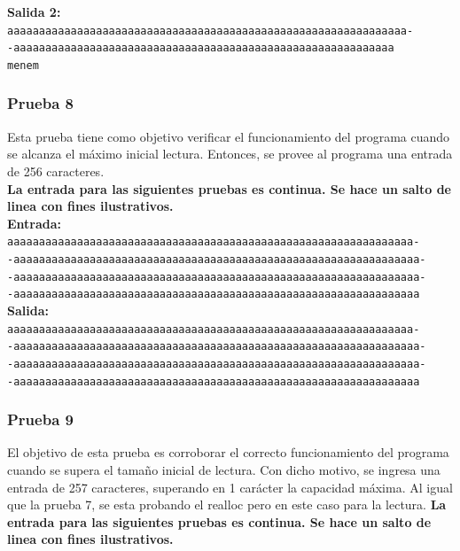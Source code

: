 \documentclass[a4paper, 10pt]{article}
\def\code#1{\texttt{#1}}
\newcommand\tab[1][0.5cm]{\hspace*{#1}}
\begin{document}
        \textbf{Salida 2:}\\
        \tab\tab\code{aaaaaaaaaaaaaaaaaaaaaaaaaaaaaaaaaaaaaaaaaaaaaaaaaaaaaaaaaaaaaaa-\\-aaaaaaaaaaaaaaaaaaaaaaaaaaaaaaaaaaaaaaaaaaaaaaaaaaaaaaaaaaaa}\\
        \tab\tab\code{menem}\\

      \subsubsection{Prueba 8}
        Esta prueba tiene como objetivo verificar el funcionamiento del programa
        cuando se alcanza el máximo inicial lectura. Entonces, se provee al
        programa una entrada de 256 caracteres.\\
        \textbf{La entrada para las siguientes pruebas es continua. Se hace un salto
        de linea con fines ilustrativos.}\\

        \textbf{Entrada:}\\
        \tab\tab\code{aaaaaaaaaaaaaaaaaaaaaaaaaaaaaaaaaaaaaaaaaaaaaaaaaaaaaaaaaaaaaaaa-\\-aaaaaaaaaaaaaaaaaaaaaaaaaaaaaaaaaaaaaaaaaaaaaaaaaaaaaaaaaaaaaaaa-\\-aaaaaaaaaaaaaaaaaaaaaaaaaaaaaaaaaaaaaaaaaaaaaaaaaaaaaaaaaaaaaaaa-\\-aaaaaaaaaaaaaaaaaaaaaaaaaaaaaaaaaaaaaaaaaaaaaaaaaaaaaaaaaaaaaaaa}\\

        \textbf{Salida:}\\
        \tab\tab\code{aaaaaaaaaaaaaaaaaaaaaaaaaaaaaaaaaaaaaaaaaaaaaaaaaaaaaaaaaaaaaaaa-\\-aaaaaaaaaaaaaaaaaaaaaaaaaaaaaaaaaaaaaaaaaaaaaaaaaaaaaaaaaaaaaaaa-\\-aaaaaaaaaaaaaaaaaaaaaaaaaaaaaaaaaaaaaaaaaaaaaaaaaaaaaaaaaaaaaaaa-\\-aaaaaaaaaaaaaaaaaaaaaaaaaaaaaaaaaaaaaaaaaaaaaaaaaaaaaaaaaaaaaaaa}\\

      \subsubsection{Prueba 9}
        El objetivo de esta prueba es corroborar el correcto funcionamiento del
        programa cuando se supera el tamaño inicial de lectura. Con dicho motivo,
        se ingresa una entrada de 257 caracteres, superando en 1 carácter la
        capacidad máxima. Al igual que la prueba 7, se esta probando el realloc
        pero en este caso para la lectura.
        \textbf{La entrada para las siguientes pruebas es continua. Se hace un salto
        de linea con fines ilustrativos.}\\
\end{document}

